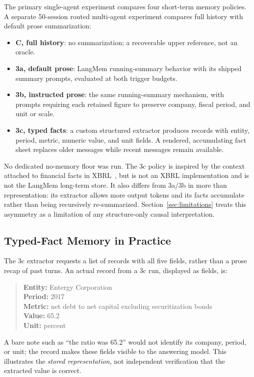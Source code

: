 \documentclass[conference,a4paper]{IEEEtran}
\begin{document}
The primary single-agent experiment compares four short-term memory policies. A separate 50-session routed multi-agent experiment compares full history with default prose summarization:
\begin{itemize}
\item \textbf{C, full history}: no summarization; a recoverable upper reference, not an oracle.
\item \textbf{3a, default prose}: LangMem running-summary behavior with its shipped summary prompts, evaluated at both trigger budgets.
\item \textbf{3b, instructed prose}: the same running-summary mechanism, with prompts requiring each retained figure to preserve company, fiscal period, and unit or scale.
\item \textbf{3c, typed facts}: a custom structured extractor produces records with entity, period, metric, numeric value, and unit fields. A rendered, accumulating fact sheet replaces older messages while recent messages remain available.
\end{itemize}
No dedicated no-memory floor was run. The 3c policy is inspired by the context attached to financial facts in XBRL~\cite{xbrl21}, but is not an XBRL implementation and is not the LangMem long-term store. It also differs from 3a/3b in more than representation: its extractor allows more output tokens and its facts accumulate rather than being recursively re-summarized. Section~\ref{sec:limitations} treats this asymmetry as a limitation of any structure-only causal interpretation.

\subsection{Typed-Fact Memory in Practice}

The 3c extractor requests a list of records with all five fields, rather than a prose recap of past turns. An actual record from a 3c run, displayed as fields, is:

\begin{quote}
\small
\textbf{Entity:} Entergy Corporation\\
\textbf{Period:} 2017\\
\textbf{Metric:} net debt to net capital excluding securitization bonds\\
\textbf{Value:} 65.2\\
\textbf{Unit:} percent
\end{quote}

A bare note such as ``the ratio was 65.2'' would not identify its company, period, or unit; the record makes these fields visible to the answering model. This illustrates the \emph{stored representation}, not independent verification that the extracted value is correct.
\end{document}
